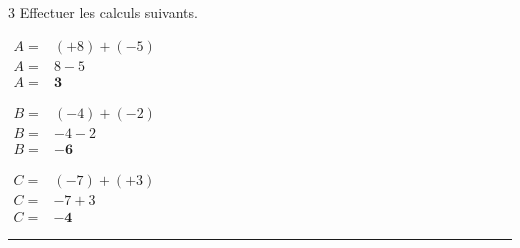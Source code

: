 \documentclass[a4paper]{book}
\begin{document}
{    \begin{exerciceNote}{3}
        Effectuer les calculs suivants.
        
        \noindent
        \begin{minipage}{0.3\linewidth}
            $\begin{array}{ll}
                A = & (+8) + (-5) \\[1ex]
                A = & 8 - 5 \\[1ex]
                A = & \mathbf{3}
            \end{array}$
        \end{minipage}
        \hfill \vline \hfill
        \begin{minipage}{0.33\linewidth}
            $\begin{array}{ll}
                B = & (-4) + (-2) \\[1ex]
                B = & -4 - 2 \\[1ex]
                B = & \mathbf{-6}
            \end{array}$
        \end{minipage}
        \hfill \vline \hfill
        \begin{minipage}{0.3\linewidth}
            $\begin{array}{ll}
                C = & (-7) + (+3) \\[1ex]
                C = & -7 + 3 \\[1ex]
                C = & \mathbf{-4}
            \end{array}$
        \end{minipage}
        
        \vspace{0.8cm}
        \hrule
        \vspace{0.8cm}
        

\end{exerciceNote}}
\end{document}
